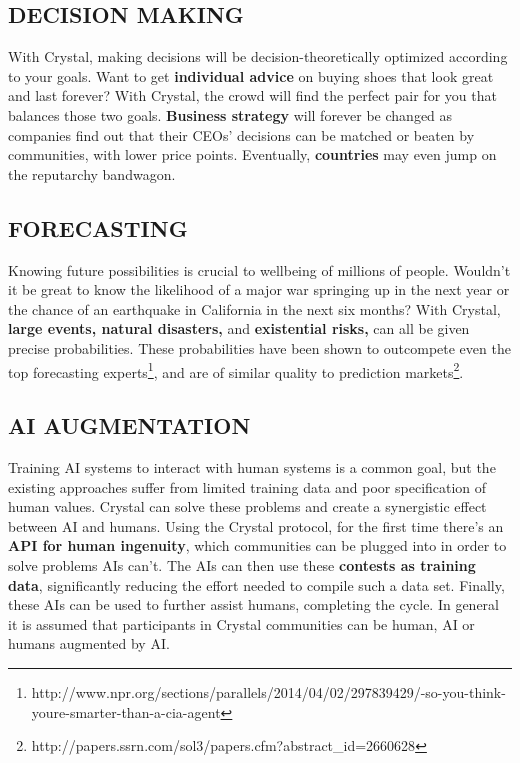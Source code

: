 \subsection{\texorpdfstring{\protect\hypertarget{_bsk46siv4dfd}{}{\protect\hypertarget{_Toc462050436}{}{}}DECISION
MAKING}{DECISION MAKING}}\label{decision-making}

With Crystal, making decisions will be decision-theoretically optimized
according to your goals. Want to get \textbf{individual advice} on
buying shoes that look great and last forever? With Crystal, the crowd
will find the perfect pair for you that balances those two goals.
\textbf{Business strategy} will forever be changed as companies find out
that their CEOs' decisions can be matched or beaten by communities, with
lower price points. Eventually, \textbf{countries} may even jump on the
reputarchy bandwagon.

\subsection{\texorpdfstring{\protect\hypertarget{_5gx0rren5smk}{}{\protect\hypertarget{_Toc462050437}{}{}}FORECASTING}{FORECASTING}}\label{forecasting}

Knowing future possibilities is crucial to wellbeing of millions of
people. Wouldn't it be great to know the likelihood of a major war
springing up in the next year or the chance of an earthquake in
California in the next six months? With Crystal, \textbf{large events,
natural disasters,} and \textbf{existential risks,} can all be given
precise probabilities. These probabilities have been shown to outcompete
even the top forecasting experts\footnote{http://www.npr.org/sections/parallels/2014/04/02/297839429/-so-you-think-youre-smarter-than-a-cia-agent},
and are of similar quality to prediction markets\footnote{http://papers.ssrn.com/sol3/papers.cfm?abstract\_id=2660628}.

\subsection{\texorpdfstring{\protect\hypertarget{_igov4cu3jmvz}{}{\protect\hypertarget{_Toc462050438}{}{}}AI
AUGMENTATION}{AI AUGMENTATION}}\label{ai-augmentation}

Training AI systems to interact with human systems is a common goal, but
the existing approaches suffer from limited training data and poor
specification of human values. Crystal can solve these problems and
create a synergistic effect between AI and humans. Using the Crystal
protocol, for the first time there's an \textbf{API for human
ingenuity}, which communities can be plugged into in order to solve
problems AIs can't. The AIs can then use these \textbf{contests as
training data}, significantly reducing the effort needed to compile such
a data set. Finally, these AIs can be used to further assist humans,
completing the cycle. In general it is assumed that participants in
Crystal communities can be human, AI or humans augmented by AI.

